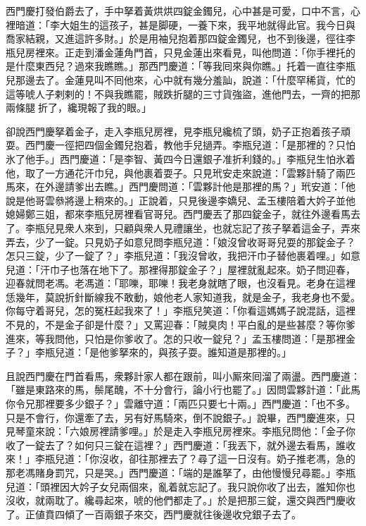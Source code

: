 西門慶打發伯爵去了，手中拏着黃烘烘四錠金鐲兒，心中甚是可愛，口中不言，心裡暗道：「李大姐生的這孩子，甚是脚硬，一養下來，我平地就得此官。我今日與喬家結親，又進這許多財。」於是用袖兒抱着那四錠金鐲兒，也不到後邊，徑往李瓶兒房裡來。正走到潘金蓮角門首，只見金蓮出來看見，叫他問道：「你手裡托的是什麼東西兒？過來我瞧瞧。」那西門慶道：「等我囘來與你瞧。」托着一直往李瓶兒那邊去了。{}金蓮見叫不囘他來，心中就有幾分羞訕，說道：「什麼罕稀貨，忙的這等唬人子剌剌的！不與我瞧罷，賊跌折腿的三寸貨強盜，進他門去，一齊的把那兩條腿𢱉折了，纔現報了我的眼。」

卻說西門慶拏着金子，走入李瓶兒房裡，見李瓶兒纔梳了頭，奶子正抱着孩子頑耍。西門慶一徑把四個金鐲兒抱着，教他手兒撾弄。李瓶兒道：「是那裡的？只怕氷了他手。」西門慶道：「是李智、黃四今日還銀子准折利錢的。」李瓶兒生怕氷着他，取了一方通花汗巾兒，與他裹着耍子。只見玳安走來說道：「雲夥計騎了兩匹馬來，在外邊請爹出去瞧。」西門慶問道：「雲夥計他是那裡的馬？」玳安道：「他說是他哥雲叅將邊上稍來的。」正說着，只見後邊李嬌兒、孟玉樓陪着大妗子並他媳婦鄭三姐，都來李瓶兒房裡看官哥兒。西門慶丟了那四錠金子，就往外邊看馬去了。李瓶兒見衆人來到，只顧與衆人見禮讓坐，也就忘記了孩子拏着這金子，弄來弄去，少了一錠。只見奶子如意兒問李瓶兒道：「娘沒曾收哥哥兒耍的那錠金子？怎只三錠，少了一錠了？」李瓶兒道：「我沒曾收，我把汗巾子替他裹着哩。」如意兒道：「汗巾子也落在地下了。那裡得那錠金子？」屋裡就亂起來。奶子問迎春，迎春就問老馮。老馮道：「耶嚛，耶嚛！我老身就瞎了眼，也沒看見。老身在這裡恁幾年，莫說折針斷線我不敢動，娘他老人家知道我，就是金子，我老身也不愛。你每守着哥兒，怎的冤枉起我來了！」李瓶兒笑道：「你看這媽媽子說混話，這裡不見的，不是金子卻是什麼？」又罵迎春：「賊臭肉！平白亂的是些甚麼？等你爹進來，等我問他，只怕是你爹收了。怎的只收一錠兒？」孟玉樓問道：「是那裡金子？」李瓶兒道：「是他爹拏來的，與孩子耍。誰知道是那裡的。」

且說西門慶在門首看馬，衆夥計家人都在跟前，叫小厮來囘溜了兩盪。西門慶道：「雖是東路來的馬，鬃尾醜，不十分會行，論小行也罷了。」因問雲夥計道：「此馬你令兄那裡要多少銀子？」雲離守道：「兩匹只要七十兩。」西門慶道：「也不多。只是不會行，你還牽了去，另有好馬騎來，倒不說銀子。」說畢，西門慶進來，只見琴童來說：「六娘房裡請爹哩。」於是走入李瓶兒房裡來。李瓶兒問他：「金子你收了一錠去了？如何只三錠在這裡？」西門慶道：「我丟下，就外邊去看馬，誰收來！」李瓶兒道：「你沒收，卻往那裡去了？尋了這一日沒有。奶子推老馮，急的那老馮賭身罰咒，只是哭。」西門慶道：「端的是誰拏了，由他慢慢兒尋罷。」李瓶兒道：「頭裡因大妗子女兒兩個來，亂着就忘記了。我只說你收了出去，誰知你也沒收，就兩耽了。纔尋起來，唬的他們都走了。」於是把那三錠，還交與西門慶收了。正値賁四傾了一百兩銀子來交，西門慶就往後邊收兌銀子去了。

